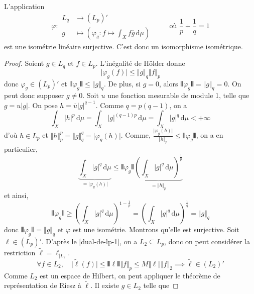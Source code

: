 
  \begin{theorem}
    L'application
    \[
    \varphi :
    \begin{array}{ll}
      L_q &\rightarrow (L_p)' \\
      g &\mapsto \left( \varphi_g : f \mapsto \int_X f \overline{g} \, \mathrm{d}\mu \right)
    \end{array}
    \qquad \text{ où } \frac{1}{p} + \frac{1}{q} = 1
    \]
    est une isométrie linéaire surjective. C'est donc un isomorphisme isométrique.
  \end{theorem}

  \begin{proof}
    Soient $g \in L_q$ et $f \in L_p$. L'inégalité de Hölder donne
    \[ \vert \varphi_g(f) \vert \leq \Vert g \Vert_q \Vert f \Vert_p \]
    donc $\varphi_g \in (L_p)'$ et $\VERT \varphi_g \VERT \leq \Vert g \Vert_q$. De plus, si $g = 0$, alors $\VERT \varphi_g \VERT = \Vert g \Vert_q = 0$. On peut donc supposer $g \neq 0$.
    \newpar
     Soit $u$ une fonction mesurable de module 1, telle que $g = u \vert g \vert$. On pose $h = \overline{u} \vert g \vert^{q-1}$. Comme $q = p(q-1)$, on a
    \[ \int_X \vert h \vert^p \, \mathrm{d}\mu = \int_X \vert g \vert^{(q-1)p} \, \mathrm{d}\mu = \int_X \vert g \vert^{q} \, \mathrm{d}\mu < + \infty \]
    d'où $h \in L_p$ et $\Vert h \Vert_p^p = \Vert g \Vert_q^q = \vert \varphi_g(h) \vert$. Comme, $\frac{\vert \varphi_g(h) \vert}{\Vert h \Vert_p} \leq \VERT \varphi_g \VERT$, on a en particulier,
    \[ \underbrace{\int_X \vert g \vert^{q} \, \mathrm{d}\mu}_{= \vert \varphi_g(h) \vert} \leq \VERT \varphi_g \VERT \underbrace{\left ( \int_X \vert g \vert^{q} \, \mathrm{d}\mu \right )^{\frac{1}{p}}}_{= \Vert h \Vert_p} \]
    et ainsi,
    \[ \VERT \varphi_g \VERT \geq \left ( \int_X \vert g \vert^{q} \, \mathrm{d}\mu \right )^{1 - \frac{1}{p}} = \left ( \int_X \vert g \vert^{q} \, \mathrm{d}\mu \right )^{\frac{1}{q}} = \Vert g \Vert_q \]
    donc $\VERT \varphi_g \VERT = \Vert g \Vert_q$ et $\varphi$ est une isométrie.
    \newpar
    Montrons qu'elle est surjective. Soit $\ell \in (L_p)'$. D'après le \cref{dual-de-lp-1}, on a $L_2 \subseteq L_p$, donc on peut considérer la restriction $\widetilde{\ell} = \ell_{| L_2}$.
    \[ \forall f \in L_2, \quad \vert \widetilde{\ell}(f) \vert \leq \VERT \ell \VERT \Vert f \Vert_p \leq M \Vert \ell \Vert \Vert f \Vert_2 \implies \widetilde{\ell} \in (L_2)' \]
    Comme $L_2$ est un espace de Hilbert, on peut appliquer le théorème de représentation de Riesz à $\widetilde{\ell}$. Il existe $g \in L_2$ telle que

\end{proof}
